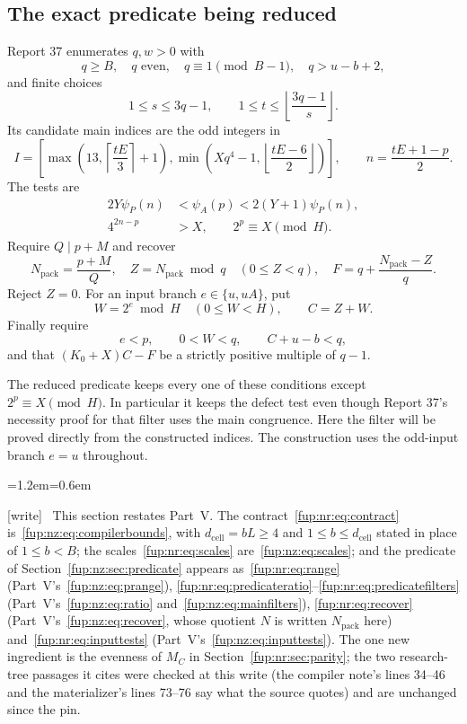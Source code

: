 \documentclass[11pt,letterpaper]{article}
\theoremstyle{definition}\newtheorem{definition}[theorem]{Definition}
\theoremstyle{remark}\newtheorem{remark}[theorem]{Remark}
\newcommand{\MC}{M_C}
\newcommand{\dcell}{d_{\mathrm{cell}}}
\newcommand{\wtag}{\textup{[write]}}
\newenvironment{writenote}{\par\smallskip\begin{list}{}{\leftmargin=1.2em\rightmargin=0.6em}\item[]\small\wtag\ }{\end{list}\smallskip}
\begin{document}
\subsection{The exact predicate being reduced}
Report 37 enumerates $q,w>0$ with
\[
 q\ge B,\quad q\text{ even},\quad q\equiv1\pmod{B-1},\quad q>u-b+2,
\]
and finite choices
\[
 1\le s\le3q-1,\qquad
 1\le t\le\left\lfloor\frac{3q-1}{s}\right\rfloor.
\]
Its candidate main indices are the odd integers in
\begin{equation}\label{fup:nr:eq:range}
 I=\left[
 \max\!\left(13,\left\lceil\frac{tE}{3}\right\rceil+1\right),
 \min\!\left(Xq^4-1,\left\lfloor\frac{tE-6}{2}\right\rfloor\right)
 \right],\qquad n=\frac{tE+1-p}{2}.
\end{equation}
The tests are
\begin{align}\label{fup:nr:eq:predicateratio}
 2Y\psi_P(n)&<\psi_A(p)<2(Y+1)\psi_P(n),\\
 4^{2n-p}&>X,\qquad 2^p\equiv X\pmod H.\label{fup:nr:eq:predicatefilters}
\end{align}
Require $Q\mid p+M$ and recover
\begin{equation}\label{fup:nr:eq:recover}
 N_{\mathrm{pack}}=\frac{p+M}{Q},\quad
 Z=N_{\mathrm{pack}}\bmod q\quad(0\le Z<q),\quad
 F=q+\frac{N_{\mathrm{pack}}-Z}{q}.
\end{equation}
Reject $Z=0$. For an input branch $e\in\{u,uA\}$, put
\[
 W=2^e\bmod H\quad(0\le W<H),\qquad C=Z+W.
\]
Finally require
\begin{equation}\label{fup:nr:eq:inputtests}
 e<p,\qquad 0<W<q,\qquad C+u-b<q,
\end{equation}
and that $(K_0+X)C-F$ be a strictly positive multiple of $q-1$.

The reduced predicate keeps every one of these conditions except $2^p\equiv X\pmod H$. In particular it keeps the defect test even though Report 37's necessity proof for that filter uses the main congruence. Here the filter will be proved directly from the constructed indices. The construction uses the odd-input branch $e=u$ throughout.
\begin{writenote}
This section restates Part~V. The contract~\eqref{fup:nr:eq:contract} is~\eqref{fup:nz:eq:compilerbounds}, with $\dcell=bL\ge4$ and $1\le b\le\dcell$ stated in place of $1\le b<B$; the scales~\eqref{fup:nr:eq:scales} are~\eqref{fup:nz:eq:scales}; and the predicate of Section~\ref{fup:nz:sec:predicate} appears as~\eqref{fup:nr:eq:range} (Part~V's~\eqref{fup:nz:eq:prange}), \eqref{fup:nr:eq:predicateratio}--\eqref{fup:nr:eq:predicatefilters} (Part~V's~\eqref{fup:nz:eq:ratio} and~\eqref{fup:nz:eq:mainfilters}), \eqref{fup:nr:eq:recover} (Part~V's~\eqref{fup:nz:eq:recover}, whose quotient $N$ is written $N_{\mathrm{pack}}$ here) and~\eqref{fup:nr:eq:inputtests} (Part~V's~\eqref{fup:nz:eq:inputtests}). The one new ingredient is the evenness of $\MC$ in Section~\ref{fup:nr:sec:parity}; the two research-tree passages it cites were checked at this write (the compiler note's lines 34--46 and the materializer's lines 73--76 say what the source quotes) and are unchanged since the pin.
\end{writenote}
\end{document}
